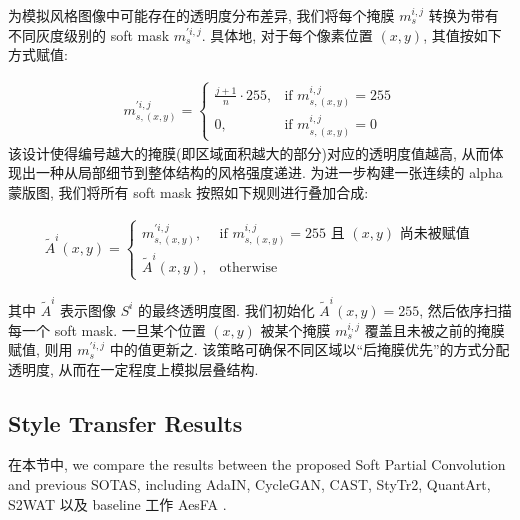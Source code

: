 为模拟风格图像中可能存在的透明度分布差异, 我们将每个掩膜 $m_s^{i,j}$ 转换为带有不同灰度级别的 soft mask $m_s^{'i,j}$. 具体地, 对于每个像素位置 $(x, y)$, 其值按如下方式赋值:

\begin{equation}
    \begin{aligned}
        \label{eq:soft-mask}
        m_{s,(x,y)}^{'i,j} = 
        \begin{cases} 
            \frac{j+1}{n} \cdot 255, & \text{if } m_{s,(x,y)}^{i,j} = 255 \\
            0, & \text{if } m_{s,(x,y)}^{i,j} = 0
        \end{cases} 
    \end{aligned}
\end{equation}
该设计使得编号越大的掩膜(即区域面积越大的部分)对应的透明度值越高, 从而体现出一种从局部细节到整体结构的风格强度递进.
为进一步构建一张连续的 alpha 蒙版图, 我们将所有 soft mask 按照如下规则进行叠加合成:

\begin{equation}
    \begin{aligned}
        \label{eq:alpha-composition}
        \tilde{A}^i(x, y) = 
        \begin{cases} m_{s,(x,y)}^{'i,j}, & \text{if } m_{s,(x,y)}^{i,j} = 255 \text{ 且 } (x, y) \text{ 尚未被赋值} \\
        \tilde{A}^i(x, y), & \text{otherwise} \end{cases}
    \end{aligned}
\end{equation}

其中 $\tilde{A}^i$ 表示图像 $S^i$ 的最终透明度图. 我们初始化 $\tilde{A}^i(x, y) = 255$, 然后依序扫描每一个 soft mask. 一旦某个位置 $(x, y)$ 被某个掩膜 $m_s^{i,j}$ 覆盖且未被之前的掩膜赋值, 则用 $m_s^{'i,j}$ 中的值更新之. 该策略可确保不同区域以“后掩膜优先”的方式分配透明度, 从而在一定程度上模拟层叠结构.


\subsection{Style Transfer Results}

在本节中, we compare the results between the proposed Soft Partial Convolution and previous SOTAS, including AdaIN\cite{huang2017arbitrary}, CycleGAN\cite{zhu2017unpaired}, CAST\cite{zhang2022domain}, StyTr2\cite{deng2022stytr2},  QuantArt\cite{huang2023quantart}, S2WAT\cite{zhang2024s2wat} 以及 baseline 工作 AesFA \cite{kwon2024aesfa}. 


